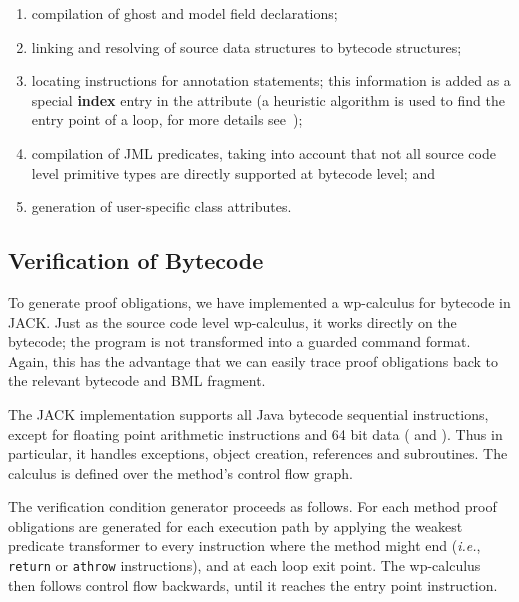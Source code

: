 \begin{enumerate}

\item compilation of ghost and model field declarations;


\item linking and resolving of source data structures to bytecode structures;

\item locating instructions for annotation statements; this
information is added as a special \textbf{index} entry in the
attribute (a heuristic algorithm is used to find the entry point of a
loop, for more details see~\cite{Pavlova:phd});

 
\item compilation of JML predicates, taking into account that not all
source code level primitive types are directly supported at bytecode
level; and

\item generation of user-specific class attributes.
    
\end{enumerate}


\subsection{Verification of Bytecode}
To generate proof obligations, we have implemented a wp-calculus for
bytecode in JACK. Just as the source code level wp-calculus, it
works directly on the bytecode; the program is not transformed into a
guarded command format. Again, this has the
advantage that we can easily trace proof obligations back to the
relevant bytecode and BML fragment.

The JACK implementation supports all Java bytecode sequential
instructions, except for floating point arithmetic instructions and 64
bit data ( and ). Thus in particular, it
handles exceptions, object creation, references and subroutines. The
calculus is defined over the method's control flow graph.


The verification condition generator proceeds as follows. For each
method proof obligations are generated for each execution path by
applying the weakest predicate transformer to every instruction where
the method might end (\emph{i.e.}, \texttt{return} or \texttt{athrow}
instructions), and at each loop exit point. The wp-calculus then
follows control flow backwards, until it reaches the entry point
instruction.

